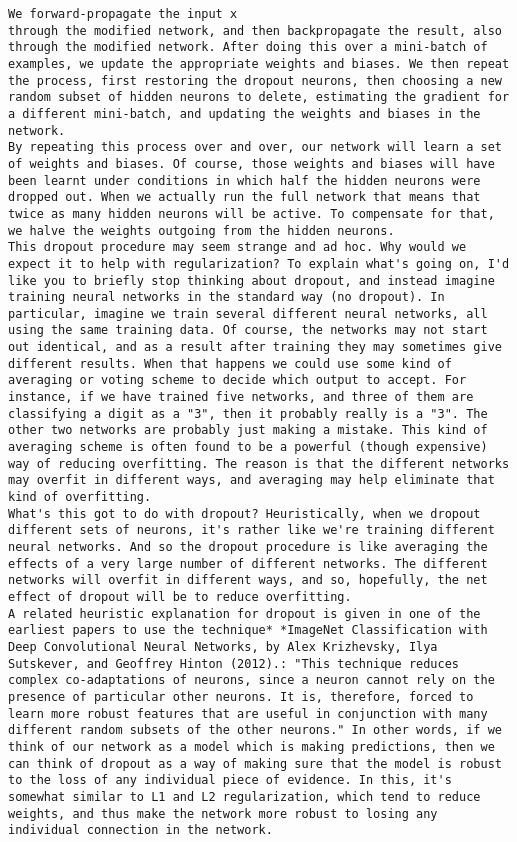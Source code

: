 \begin{lstlisting}
We forward-propagate the input x
through the modified network, and then backpropagate the result, also through the modified network. After doing this over a mini-batch of examples, we update the appropriate weights and biases. We then repeat the process, first restoring the dropout neurons, then choosing a new random subset of hidden neurons to delete, estimating the gradient for a different mini-batch, and updating the weights and biases in the network.
By repeating this process over and over, our network will learn a set of weights and biases. Of course, those weights and biases will have been learnt under conditions in which half the hidden neurons were dropped out. When we actually run the full network that means that twice as many hidden neurons will be active. To compensate for that, we halve the weights outgoing from the hidden neurons.
This dropout procedure may seem strange and ad hoc. Why would we expect it to help with regularization? To explain what's going on, I'd like you to briefly stop thinking about dropout, and instead imagine training neural networks in the standard way (no dropout). In particular, imagine we train several different neural networks, all using the same training data. Of course, the networks may not start out identical, and as a result after training they may sometimes give different results. When that happens we could use some kind of averaging or voting scheme to decide which output to accept. For instance, if we have trained five networks, and three of them are classifying a digit as a "3", then it probably really is a "3". The other two networks are probably just making a mistake. This kind of averaging scheme is often found to be a powerful (though expensive) way of reducing overfitting. The reason is that the different networks may overfit in different ways, and averaging may help eliminate that kind of overfitting.
What's this got to do with dropout? Heuristically, when we dropout different sets of neurons, it's rather like we're training different neural networks. And so the dropout procedure is like averaging the effects of a very large number of different networks. The different networks will overfit in different ways, and so, hopefully, the net effect of dropout will be to reduce overfitting.
A related heuristic explanation for dropout is given in one of the earliest papers to use the technique* *ImageNet Classification with Deep Convolutional Neural Networks, by Alex Krizhevsky, Ilya Sutskever, and Geoffrey Hinton (2012).: "This technique reduces complex co-adaptations of neurons, since a neuron cannot rely on the presence of particular other neurons. It is, therefore, forced to learn more robust features that are useful in conjunction with many different random subsets of the other neurons." In other words, if we think of our network as a model which is making predictions, then we can think of dropout as a way of making sure that the model is robust to the loss of any individual piece of evidence. In this, it's somewhat similar to L1 and L2 regularization, which tend to reduce weights, and thus make the network more robust to losing any individual connection in the network.

\end{lstlisting}
